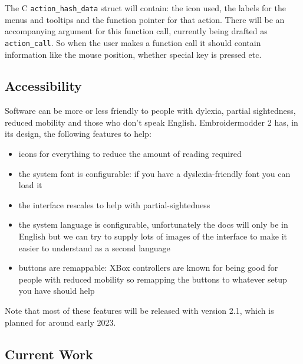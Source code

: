\documentclass[10pt]{report}
\begin{document}
The C \texttt{action\_hash\_data} struct will contain: the icon used, the labels for the
menus and tooltips and the function pointer for that action.
There will be an accompanying argument for this function call, currently being
drafted as \texttt{action\_call}. So when the user makes a function call it should
contain information like the mouse position, whether special key is pressed
etc.

\subsection{Accessibility}

Software can be more or less friendly to people with dylexia, partial sightedness,
reduced mobility and those who don't speak English.
Embroidermodder 2 has, in its design, the following features to help:

\begin{itemize}
\item icons for everything to reduce the amount of reading required
\item the system font is configurable: if you have a dyslexia-friendly font you can load it
\item the interface rescales to help with partial-sightedness
\item the system language is configurable, unfortunately the docs will only be in English but we can try to supply lots of images of the interface to make it easier to understand as a second language
\item buttons are remappable: XBox controllers are known for being good for people with reduced mobility so remapping the buttons to whatever setup you have should help
\end{itemize}

Note that most of these features will be released with version 2.1, which is planned for around early 2023.

\subsection{Current Work}
\end{document}
